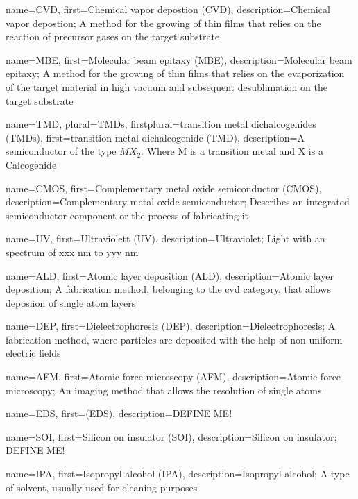 {
    name={CVD},
    first={Chemical vapor depostion (CVD)},
    description={Chemical vapor depostion; A method for the growing of thin films that relies on the reaction of precursor gases on the target substrate}
}

{
    name={MBE},
    first={Molecular beam epitaxy (MBE)},
    description={Molecular beam epitaxy; A method for the growing of thin films that relies on the evaporization of the target material in high vacuum and subsequent desublimation on the target substrate}
}

{
    name={TMD},
    plural={TMDs},
    firstplural={transition metal dichalcogenides (TMDs)},
    first={transition metal dichalcogenide (TMD)},
    description={A semiconductor of the type $MX_{2}$. Where M is a transition metal and X is a Calcogenide}
}

{
    name={CMOS},
    first={Complementary metal oxide semiconductor (CMOS)},
    description={Complementary metal oxide semiconductor; Describes an integrated semiconductor component or the process of fabricating it}
}

{
    name={UV},
    first={Ultraviolett (UV)},
    description={Ultraviolet; Light with an spectrum of xxx nm to yyy nm}
}

{
    name={ALD},
    first={Atomic layer deposition (ALD)},
    description={Atomic layer deposition; A fabrication method, belonging to the \gls{cvd} category, that allows deposiion of single atom layers}
}

{
    name={DEP},
    first={Dielectrophoresis (DEP)},
    description={Dielectrophoresis; A fabrication method, where particles are deposited with the help of non-uniform electric fields}
}

{
    name={AFM},
    first={Atomic force microscopy (AFM)},
    description={Atomic force microscopy; An imaging method that allows the resolution of single atoms.}
}

{
    name={EDS},
    first={(EDS)},
    description={DEFINE ME!}
}

{
    name={SOI},
    first={Silicon on insulator (SOI)},
    description={Silicon on insulator; DEFINE ME!}
}

{
    name={IPA},
    first={Isopropyl alcohol (IPA)},
    description={Isopropyl alcohol; A type of solvent, usually used for cleaning purposes}
}

